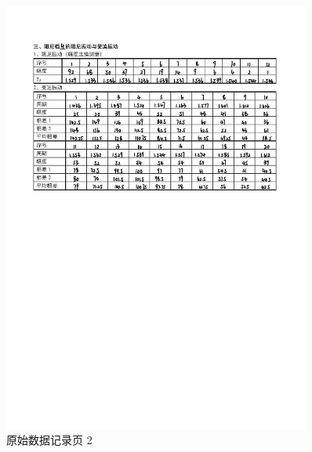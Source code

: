 \documentclass[12pt,a4paper]{amsart}
\begin{document}
\begin{figure}[h]
	\centering
	\includegraphics[width=0.9\textwidth]{img/original_data_page_2.jpg}
	\caption{原始数据记录页 2}
	\label{fig:original_data_page_2}
\end{figure}


{\footnotesize}
\end{document}

